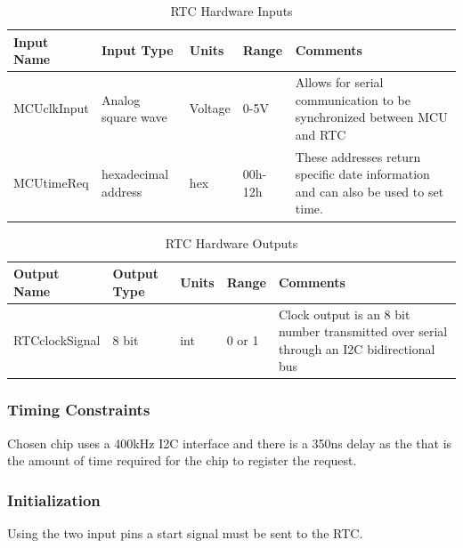 \documentclass[12pt,titlepage]{article}
\begin{document}
\begin{table}[ht!]
\begin{center}
\begin{adjustbox}{max width=\textwidth}
\small
\begin{tabular}{|p{}|p{}|p{}|p{}|p{}|}
 \hline
 \textbf{Input Name} & \textbf{Input Type} & \textbf{Units} &\textbf{Range} & \textbf{Comments} \\
 \hline 
MCUclkInput & Analog square wave & Voltage & 0-5V & Allows for serial communication to be synchronized between MCU and RTC\\
 \hline 
MCUtimeReq & hexadecimal address & hex & 00h-12h & These addresses return specific date information and can also be used to set time.\\
 \hline
\end{tabular}
\end{adjustbox}
\end{center}
\caption{RTC Hardware Inputs}
\end{table}

\begin{table}[ht!]
\begin{center}
\begin{adjustbox}{max width=\textwidth}
\small
\begin{tabular}{|p{}|p{}|p{}|p{}|p{}|}
 \hline
 \textbf{Output Name} & \textbf{Output Type} & \textbf{Units} &\textbf{Range} & \textbf{Comments} \\
 \hline 
 RTCclockSignal & 8 bit & int & 0 or 1 & Clock output is an 8 bit number transmitted over serial through an I2C bidirectional bus \\
 \hline
\end{tabular}
\end{adjustbox}
\end{center}
\caption{RTC Hardware Outputs}
\end{table}

\subsubsection*{Timing Constraints}
Chosen chip uses a 400kHz I2C interface and there is a 350ns delay as the that is the amount of time required for the chip to register the request. 

\subsubsection*{Initialization}
Using the two input pins a start signal must be sent to the RTC. 
\end{document}
